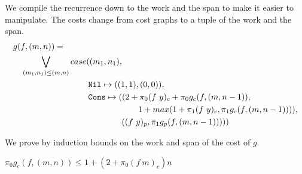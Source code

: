 We compile the recurrence down to the work and the span to make it easier to manipulate.
The costs change from cost graphs to a tuple of the work and the span.
\begin{equation*}
  \begin{split}
  &g(f, (m, n)) = \\
  &\quad \bigvee\limits_{(m_1, n_1) \leq (m, n)} case((m_1, n_1), \\
  &\qquad\quad\quad\quad\qquad\quad\quad \texttt{Nil} \mapsto ((1, 1), (0, 0)), \\
  &\qquad\quad\quad\quad\qquad\quad\quad \texttt{Cons} \mapsto ((2 + \pi_0(f\ y)_c + \pi_0 g_c(f, (m, n-1)), \\
  &\qquad\quad\quad\quad\qquad\quad\quad\quad\qquad\quad\quad\quad                     1 + max(1 + \pi_1(f\ y)_c, \pi_1 g_c(f, (m, n-1)))), \\
  &\qquad\quad\quad\quad\qquad\quad\quad\quad\quad\quad\quad                  ((f\ y)_p, \pi_1 g_p(f, (m, n-1)))))
  \end{split}
\end{equation*}

We prove by induction bounds on the work and span of the cost of $g$.

\begin{theorem}
$\pi_0 g_c(f, (m, n)) \leq 1 + (2 + \pi_0(f\ m)_c)n$
\end{theorem}


